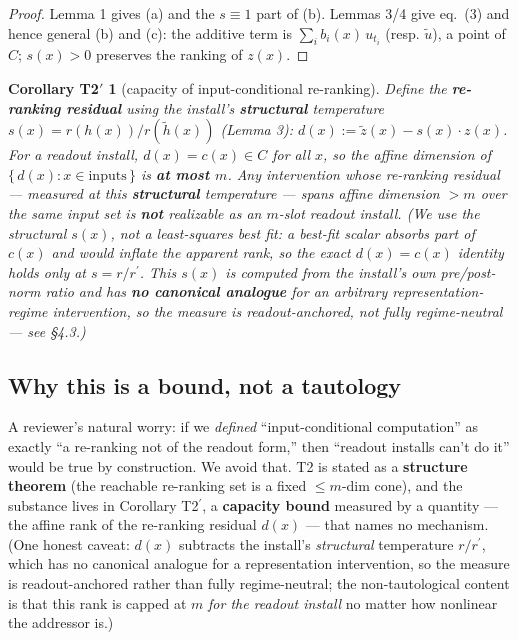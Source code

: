 \documentclass[11pt]{article}
\theoremstyle{plain}
\newtheorem*{corTtwop}{Corollary T2$'$}
\theoremstyle{definition}
\begin{document}
\begin{proof}
Lemma 1 gives (a) and the $s \equiv 1$ part of (b). Lemmas 3/4 give eq.~(3) and hence general (b) and (c): the additive term is $\sum_i b_i(x)\, u_{t_i}$ (resp. $\tilde u$), a point of $C$; $s(x) > 0$ preserves the ranking of $z(x)$.
\end{proof}

\begin{corTtwop}[capacity of input-conditional re-ranking]
Define the \textbf{re-ranking residual} using the install's \textbf{structural} temperature $s(x) = r(h(x))/r(\tilde h(x))$ (Lemma 3): $d(x) := \tilde z(x) - s(x)\cdot z(x)$. For a readout install, $d(x) = c(x) \in C$ for all $x$, so the affine dimension of $\{\, d(x) : x \in \mathrm{inputs} \,\}$ is \textbf{at most $m$}. Any intervention whose re-ranking residual --- measured at this \textbf{structural} temperature --- spans affine dimension $> m$ over the same input set is \textbf{not} realizable as an $m$-slot readout install. (We use the structural $s(x)$, not a least-squares best fit: a best-fit scalar absorbs part of $c(x)$ and would inflate the apparent rank, so the exact $d(x) = c(x)$ identity holds only at $s = r/r^{\prime}$. This $s(x)$ is computed from the install's own pre/post-norm ratio and has \textbf{no canonical analogue} for an arbitrary representation-regime intervention, so the measure is readout-anchored, not fully regime-neutral --- see \S4.3.)
\end{corTtwop}

\subsection{Why this is a bound, not a tautology}

A reviewer's natural worry: if we \emph{defined} ``input-conditional computation'' as exactly ``a re-ranking not of the readout form,'' then ``readout installs can't do it'' would be true by construction. We avoid that. T2 is stated as a \textbf{structure theorem} (the reachable re-ranking set is a fixed $\le m$-dim cone), and the substance lives in Corollary T2$^{\prime}$, a \textbf{capacity bound} measured by a quantity --- the affine rank of the re-ranking residual $d(x)$ --- that names no mechanism. (One honest caveat: $d(x)$ subtracts the install's \emph{structural} temperature $r/r^{\prime}$, which has no canonical analogue for a representation intervention, so the measure is readout-anchored rather than fully regime-neutral; the non-tautological content is that this rank is capped at $m$ \emph{for the readout install} no matter how nonlinear the addressor is.)
\end{document}

